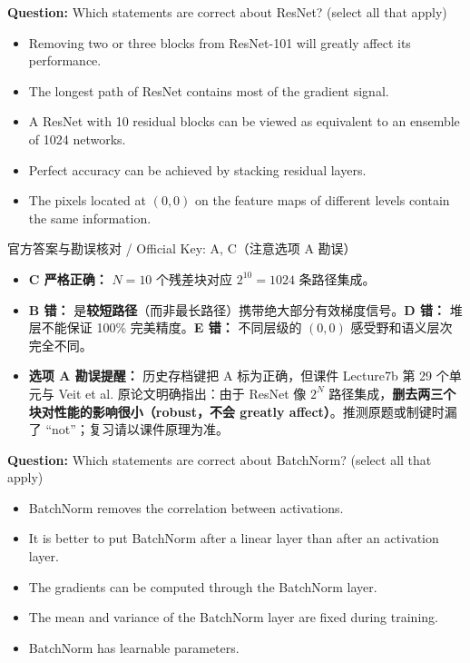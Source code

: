 \textbf{Question:} Which statements are correct about ResNet? (select all that apply)
\begin{itemize}
\item[A)] Removing two or three blocks from ResNet-101 will greatly affect its performance.
\item[B)] The longest path of ResNet contains most of the gradient signal.
\item[C)] A ResNet with 10 residual blocks can be viewed as equivalent to an ensemble of 1024 networks.
\item[D)] Perfect accuracy can be achieved by stacking residual layers.
\item[E)] The pixels located at $(0, 0)$ on the feature maps of different levels contain the same information.
\end{itemize}

\begin{StudySolution}{官方答案与勘误核对 / Official Key: A, C（注意选项 A 勘误）}
\begin{itemize}
\item \textbf{C 严格正确：} $N=10$ 个残差块对应 $2^{10}=1024$ 条路径集成。
\item \textbf{B 错：} 是\textbf{较短路径}（而非最长路径）携带绝大部分有效梯度信号。\textbf{D 错：} 堆层不能保证 100\% 完美精度。\textbf{E 错：} 不同层级的 $(0,0)$ 感受野和语义层次完全不同。
\item \textbf{选项 A 勘误提醒：} 历史存档键把 A 标为正确，但课件 Lecture7b 第 29 个单元与 Veit et al. 原论文明确指出：由于 ResNet 像 $2^N$ 路径集成，\textbf{删去两三个块对性能的影响很小（robust，不会 greatly affect）}。推测原题或制键时漏了 ``not''；复习请以课件原理为准。
\end{itemize}
\end{StudySolution}

\textbf{Question:} Which statements are correct about BatchNorm? (select all that apply)
\begin{itemize}
\item[A)] BatchNorm removes the correlation between activations.
\item[B)] It is better to put BatchNorm after a linear layer than after an activation layer.
\item[C)] The gradients can be computed through the BatchNorm layer.
\item[D)] The mean and variance of the BatchNorm layer are fixed during training.
\item[E)] BatchNorm has learnable parameters.
\end{itemize}


